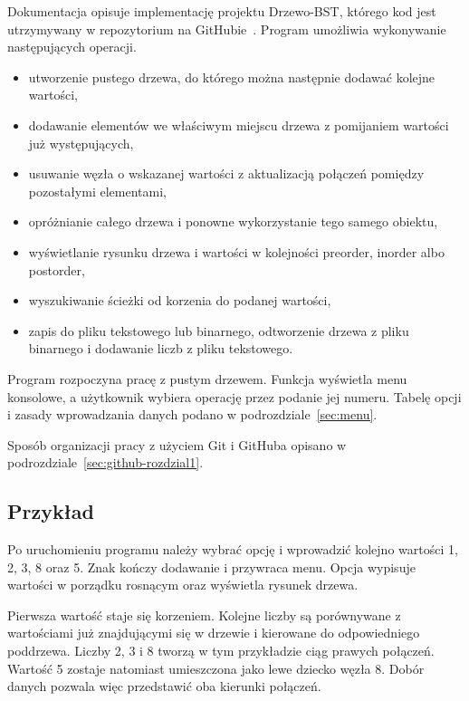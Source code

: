 Dokumentacja opisuje implementację projektu Drzewo-BST, którego kod
jest utrzymywany w repozytorium na GitHubie~\cite{repozytorium}.
Program umożliwia wykonywanie następujących operacji.
\begin{itemize}
  \item utworzenie pustego drzewa, do którego można następnie
        dodawać kolejne wartości,
  \item dodawanie elementów we właściwym miejscu drzewa
        z pomijaniem wartości już występujących,
  \item usuwanie węzła o wskazanej wartości z aktualizacją
        połączeń pomiędzy pozostałymi elementami,
  \item opróżnianie całego drzewa i ponowne wykorzystanie
        tego samego obiektu,
  \item wyświetlanie rysunku drzewa i wartości w kolejności preorder,
        inorder albo postorder,
  \item wyszukiwanie ścieżki od korzenia do podanej wartości,
  \item zapis do pliku tekstowego lub binarnego, odtworzenie drzewa
        z pliku binarnego i dodawanie liczb z pliku tekstowego.
\end{itemize}

Program rozpoczyna pracę z pustym drzewem. Funkcja 
wyświetla menu konsolowe, a użytkownik wybiera operację przez podanie
jej numeru. Tabelę opcji i zasady wprowadzania danych podano
w podrozdziale~\ref{sec:menu}.

Sposób organizacji pracy z użyciem Git i GitHuba opisano
w podrozdziale~\ref{sec:github-rozdzial1}.

\subsection{Przykład}

Po uruchomieniu programu należy wybrać opcję  i wprowadzić
kolejno wartości 1, 2, 3, 8 oraz 5. Znak  kończy dodawanie
i przywraca menu. Opcja  wypisuje wartości w porządku
rosnącym oraz wyświetla rysunek drzewa.

Pierwsza wartość staje się korzeniem. Kolejne liczby są porównywane
z wartościami już znajdującymi się w drzewie i kierowane
do odpowiedniego poddrzewa. Liczby 2, 3 i 8 tworzą w tym przykładzie
ciąg prawych połączeń. Wartość 5 zostaje natomiast umieszczona
jako lewe dziecko węzła 8. Dobór danych pozwala więc przedstawić
oba kierunki połączeń.

